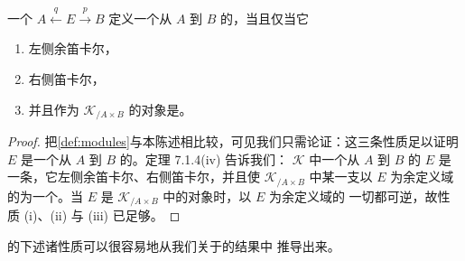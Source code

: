 \begin{proposition}\label{prop:module-characterization}
一个\trTwoSidedIsofibration{} $A\xleftarrow{q}E\xrightarrow{p}B$ 定义一个从
$A$ 到 $B$
的\trModule{}，当且仅当它
\begin{enumerate}[label=(\roman*)]
\item 左侧余笛卡尔，
\item 右侧笛卡尔，
\item 并且作为 $\mathcal{K}_{/A\times B}$ 的对象是\trDiscrete{}。
\end{enumerate}
\end{proposition}

\begin{proof}
把\cref{def:modules}与本陈述相比较，可见我们只需论证：这三条性质足以证明 $E$
是一个从 $A$ 到 $B$ 的\trTwoSidedFibration{}。定理 7.1.4(iv) 告诉我们：%
\trInfinityCosmos{} $\mathcal{K}$ 中一个从 $A$ 到 $B$ 的\trTwoSidedFibration{}
$E$ 是一条\trTwoSidedIsofibration{}，它左侧余笛卡尔、右侧笛卡尔，并且使 $\mathcal{K}_{/A\times B}$
中某一支以 $E$ 为余定义域的\trNaturalTransformation{}为一个\trIsomorphism{}。当
$E$ 是 $\mathcal{K}_{/A\times B}$ 中的\trDiscrete{}对象时，以 $E$ 为余定义域的
一切\trNaturalTransformation{}都可逆，故性质 (i)、(ii) 与 (iii) 已足够。
\end{proof}

\trModule{}的下述诸性质可以很容易地从我们关于\trTwoSidedFibration{}的结果中
推导出来。

